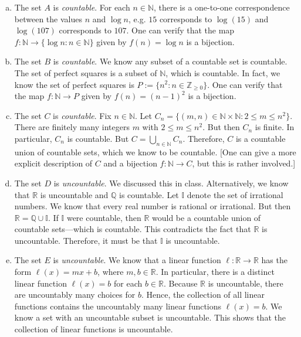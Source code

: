 \documentclass[11pt,letterpaper]{article}
\begin{document}
\sol
\begin{enumerate}[(a)]
\item The set $A$ is \textit{countable}. For each $n \in \mathbb{N}$, there is a one-to-one correspondence between the values $n$ and $\log n$, e.g. $15$ corresponds to $\log(15)$ and $\log(107)$ corresponds to $107$. One can verify that the map $f: \mathbb{N} \to \{ \log n \colon n \in \mathbb{N} \}$ given by $f(n)= \log n$ is a bijection. 

\item The set $B$ is \textit{countable}. We know any subset of a countable set is countable. The set of perfect squares is a subset of $\mathbb{N}$, which is countable. In fact, we know the set of perfect squares is $P:= \{ n^2 \colon n \in \mathbb{Z}_{\geq 0} \}$. One can verify that the map $f: \mathbb{N} \to P$ given by $f(n)= (n - 1)^2$ is a bijection. 

\item The set $C$ is \textit{countable}. Fix $n \in \mathbb{N}$. Let $C_n= \{ (m, n) \in \mathbb{N} \times \mathbb{N} \colon 2 \leq m \leq n^2 \}$. There are finitely many integers $m$ with $2 \leq m \leq n^2$. But then $C_n$ is finite. In particular, $C_n$ is countable. But $C= \bigcup_{n \in \mathbb{N}} C_n$. Therefore, $C$ is a countable union of countable sets, which we know to be countable. [One can give a more explicit description of $C$ and a bijection $f: \mathbb{N} \to C$, but this is rather involved.]

\item The set $D$ is \textit{uncountable}. We discussed this in class. Alternatively, we know that $\mathbb{R}$ is uncountable and $\mathbb{Q}$ is countable. Let $\mathbb{I}$ denote the set of irrational numbers. We know that every real number is rational or irrational. But then $\mathbb{R}= \mathbb{Q} \cup \mathbb{I}$. If $\mathbb{I}$ were countable, then $\mathbb{R}$ would be a countable union of countable sets---which is countable. This contradicts the fact that $\mathbb{R}$ is uncountable. Therefore, it must be that $\mathbb{I}$ is uncountable. 

\item The set $E$ is \textit{uncountable}. We know that a linear function $\ell: \mathbb{R} \to \mathbb{R}$ has the form $\ell(x)= mx + b$, where $m, b \in \mathbb{R}$. In particular, there is a distinct linear function $\ell(x)= b$ for each $b \in \mathbb{R}$. Because $\mathbb{R}$ is uncountable, there are uncountably many choices for $b$. Hence, the collection of all linear functions contains the uncountably many linear functions $\ell(x)= b$. We know a set with an uncountable subset is uncountable. This shows that the collection of linear functions is uncountable. 


\end{enumerate}
\end{document}
